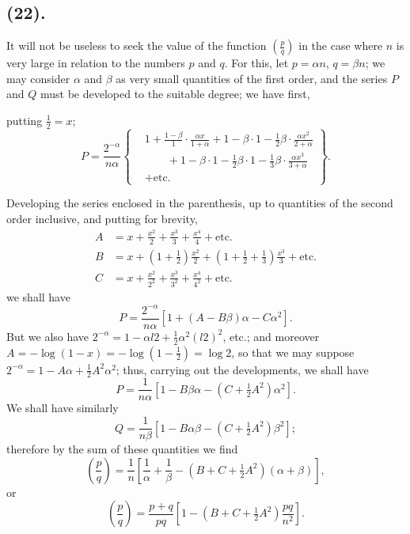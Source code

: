 \documentclass{article}
\begin{document}
\subsection*{(22).}

It will not be useless to seek the value of the function $\left(\frac{p}{q}\right)$ in the case where $n$ is very large in relation to the numbers $p$ and $q$. For this, let $p=\alpha n$, $q=\beta n$; we may consider $\alpha$ and $\beta$ as very small quantities of the first order, and the series $P$ and $Q$ must be developed to the suitable degree; we have first,

putting $\frac{1}{2}=x$;
\[ P=\frac{2^{-\alpha}}{n\alpha}\left\{\begin{aligned} &1+\frac{1-\beta}{1}\cdot\frac{\alpha x}{1+\alpha}+1-\beta\cdot 1-\tfrac{1}{2}\beta\cdot\frac{\alpha x^{2}}{2+\alpha}\\ &\qquad+1-\beta\cdot 1-\tfrac{1}{2}\beta\cdot 1-\tfrac{1}{3}\beta\cdot\frac{\alpha x^{3}}{3+\alpha}\\ &+\text{etc.} \end{aligned}\right\}. \]

Developing the series enclosed in the parenthesis, up to quantities of the second order inclusive, and putting for brevity,
\[ \begin{aligned} A&=x+\frac{x^{2}}{2}+\frac{x^{3}}{3}+\frac{x^{4}}{4}+\text{etc.}\\ B&=x+\left(1+\tfrac{1}{2}\right)\frac{x^{2}}{2}+\left(1+\tfrac{1}{2}+\tfrac{1}{3}\right)\frac{x^{3}}{3}+\text{etc.}\\ C&=x+\frac{x^{2}}{2^{2}}+\frac{x^{3}}{3^{2}}+\frac{x^{4}}{4^{2}}+\text{etc.} \end{aligned} \]
we shall have
\[ P=\frac{2^{-\alpha}}{n\alpha}\left[1+(A-B\beta)\alpha-C\alpha^{2}\right]. \]
But we also have $2^{-\alpha}=1-\alpha l2+\frac{1}{2}\alpha^{2}(l2)^{2}$, etc.; and moreover $A=-\log(1-x)=-\log\left(1-\frac{1}{2}\right)=\log 2$, so that we may suppose $2^{-\alpha}=1-A\alpha+\frac{1}{2}A^{2}\alpha^{2}$; thus, carrying out the developments, we shall have
\[ P=\frac{1}{n\alpha}\left[1-B\beta\alpha-\left(C+\tfrac{1}{2}A^{2}\right)\alpha^{2}\right]. \]
We shall have similarly
\[ Q=\frac{1}{n\beta}\left[1-B\alpha\beta-\left(C+\tfrac{1}{2}A^{2}\right)\beta^{2}\right]; \]
therefore by the sum of these quantities we find
\[ \left(\frac{p}{q}\right)=\frac{1}{n}\left[\frac{1}{\alpha}+\frac{1}{\beta}-\left(B+C+\tfrac{1}{2}A^{2}\right)(\alpha+\beta)\right], \]
or
\[ \left(\frac{p}{q}\right)=\frac{p+q}{pq}\left[1-\left(B+C+\tfrac{1}{2}A^{2}\right)\frac{pq}{n^{2}}\right]. \]
\end{document}
